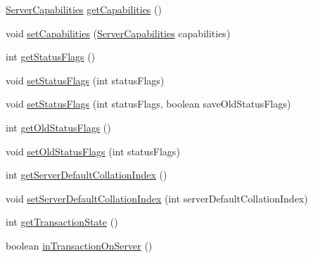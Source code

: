 \begin{DoxyCompactItemize}
\item 
\mbox{\hyperlink{interfacecom_1_1mysql_1_1cj_1_1protocol_1_1_server_capabilities}{Server\+Capabilities}} \mbox{\hyperlink{classcom_1_1mysql_1_1cj_1_1protocol_1_1x_1_1_x_server_session_a71d555b1492164b97f0efe51c235b674}{get\+Capabilities}} ()
\item 
void \mbox{\hyperlink{classcom_1_1mysql_1_1cj_1_1protocol_1_1x_1_1_x_server_session_a17fb384d0559b3b6c12369406c02b68a}{set\+Capabilities}} (\mbox{\hyperlink{interfacecom_1_1mysql_1_1cj_1_1protocol_1_1_server_capabilities}{Server\+Capabilities}} capabilities)
\item 
int \mbox{\hyperlink{classcom_1_1mysql_1_1cj_1_1protocol_1_1x_1_1_x_server_session_a40482eb0bd6517855653665d70e5fd58}{get\+Status\+Flags}} ()
\item 
void \mbox{\hyperlink{classcom_1_1mysql_1_1cj_1_1protocol_1_1x_1_1_x_server_session_a30539eae0f7311ac3cd5c9f44c8f7585}{set\+Status\+Flags}} (int status\+Flags)
\item 
void \mbox{\hyperlink{classcom_1_1mysql_1_1cj_1_1protocol_1_1x_1_1_x_server_session_a6b21c9c5c8446643ae85e58c3fe97af8}{set\+Status\+Flags}} (int status\+Flags, boolean save\+Old\+Status\+Flags)
\item 
int \mbox{\hyperlink{classcom_1_1mysql_1_1cj_1_1protocol_1_1x_1_1_x_server_session_a17dc969e016276c6ccb9ae03ca950da5}{get\+Old\+Status\+Flags}} ()
\item 
void \mbox{\hyperlink{classcom_1_1mysql_1_1cj_1_1protocol_1_1x_1_1_x_server_session_aff18996cbbfff84c6770377bc60d2225}{set\+Old\+Status\+Flags}} (int status\+Flags)
\item 
int \mbox{\hyperlink{classcom_1_1mysql_1_1cj_1_1protocol_1_1x_1_1_x_server_session_abbcbd0f1d4c0c4fab564b3ce8083ecf7}{get\+Server\+Default\+Collation\+Index}} ()
\item 
void \mbox{\hyperlink{classcom_1_1mysql_1_1cj_1_1protocol_1_1x_1_1_x_server_session_a2356570d8139fdbd022d253859128cd4}{set\+Server\+Default\+Collation\+Index}} (int server\+Default\+Collation\+Index)
\item 
int \mbox{\hyperlink{classcom_1_1mysql_1_1cj_1_1protocol_1_1x_1_1_x_server_session_ab49919f80a96ee3bd61cd00d94018dda}{get\+Transaction\+State}} ()
\item 
boolean \mbox{\hyperlink{classcom_1_1mysql_1_1cj_1_1protocol_1_1x_1_1_x_server_session_a1f0cc28ad6438f7e898fdcbd1da430de}{in\+Transaction\+On\+Server}} ()
\item 

\end{DoxyCompactItemize}
